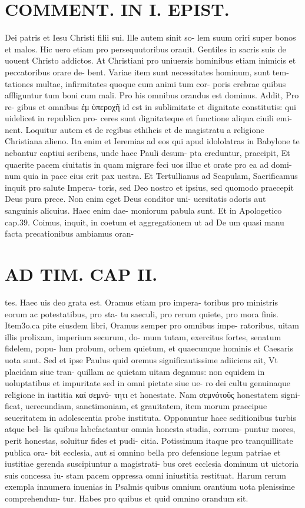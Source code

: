 \documentclass{article}
\begin{document}
\begin{pages}
\section*{COMMENT. IN I. EPIST. }\pstart Dei patris et Iesu Christi filii sui. Ille autem sinit so- lem suum oriri super bonos et malos. Hic uero etiam pro persequutoribus orauit. Gentiles in sacris suis de uouent Christo addictos. At Christiani pro uniuersis hominibus etiam inimicis et peccatoribus orare de- bent. Variae item sunt necessitates hominum, sunt tem- tationes multae, infirmitates quoque cum animi tum cor- poris crebrae quibus affliguntur tum boni cum mali. Pro his omnibus orandus est dominus. Addit, Pro re- gibus et omnibus ἐμ ὑπεροχῆ id est in sublimitate et dignitate constitutis: qui uidelicet in republica pro- ceres sunt dignitateque et functione aliqua ciuili emi- nent. Loquitur autem et de regibus ethihcis et de magistratu a religione Christiana alieno. Ita enim et Ieremias ad eos qui apud idololatras in Babylone te nebantur captiui scribens, unde haec Pauli desum- pta creduntur, praecipit, Et quaerite pacem ciuitatis in quam migrare feci uos illuc et orate pro ea ad domi- num quia in pace eius erit pax uestra. Et Tertullianus ad Scapulam, Sacrificamus inquit pro salute Impera- toris, sed Deo nostro et ipsius, sed quomodo praecepit Deus pura prece. Non enim eget Deus conditor uni- uersitatis odoris aut sanguinis alicuius. Haec enim dae- moniorum pabula sunt. Et in Apologetico cap.39. Coimus, inquit, in coetum et aggregationem ut ad De um quasi manu facta precationibus ambiamus oran-  \pend
\section*{AD TIM. CAP II. }
\marginpar{[ p.112 ]}\pstart tes. Haec uis deo grata est. Oramus etiam pro impera- toribus pro ministris eorum ac potestatibus, pro sta- tu saeculi, pro rerum quiete, pro mora finis. Item3o.ca pite eiusdem libri, Oramus semper pro omnibus impe- ratoribus, uitam illis prolixam, imperium securum, do- mum tutam, exercitus fortes, senatum fidelem, popu- lum probum, orbem quietum, et quaecunque hominis et Caesaris uota sunt. Sed et ipse Paulus quid oremus significautissime adiiciens ait, Vt placidam siue tran- quillam ac quietam uitam degamus: non equidem in uoluptatibus et impuritate sed in omni pietate siue ue- ro dei cultu genuinaque religione in iustitia καί σεμνό- τητι et honestate. Nam σεμνότοῦς honestatem signi- ficat, uerecundiam, sanctimoniam, et grauitatem, item morum praecipue seueritatem in adolescentia probe instituta. Opponuntur haec seditionibus turbis atque bel- lis quibus labefactantur omnia honesta studia, corrum- puntur mores, perit honestas, soluitur fides et pudi- citia. Potissimum itaque pro tranquillitate publica ora- bit ecclesia, aut si omnino bella pro defensione legum patriae et iustitiae gerenda suscipiuntur a magistrati- bus oret ecclesia dominum ut uictoria suis concessa iu- stam pacem oppressa omni iniustitia restituat. Harum rerum exempla innumera inuenias in Psalmis quibus omnium orantium uota plenissime comprehendun- tur. Habes pro quibus et quid omnino orandum sit.  \pend

\end{pages}
\end{document}
